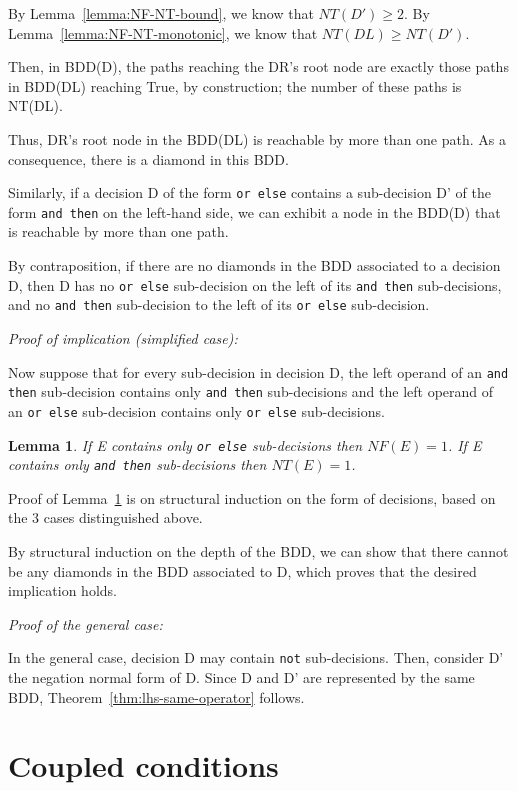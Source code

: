 \documentclass[a4paper,12pt,twoside]{article}
\renewcommand{\ge}{\geqslant}
\newcommand{\andthen}{\texttt{and then}}
\newcommand{\orelse}{\texttt{or else}}
\newcommand{\adanot}{\texttt{not}}
\newtheorem{lemma}{Lemma}[subsection]
\begin{document}
By Lemma~\ref{lemma:NF-NT-bound}, we know that $NT(D') \ge 2$. By
Lemma~\ref{lemma:NF-NT-monotonic}, we know that $NT(DL) \ge NT(D')$.

Then, in BDD(D), the paths reaching the DR's root node are exactly
those paths in BDD(DL) reaching True, by construction; the number of
these paths is NT(DL).

Thus, DR's root node in the BDD(DL) is reachable by more than one
path. As a consequence, there is a diamond in this BDD.

Similarly, if a decision D of the form \orelse{} contains a
sub-decision D' of the form \andthen{} on the left-hand side, we can
exhibit a node in the BDD(D) that is reachable by more
than one path.

By contraposition, if there are no diamonds in the BDD associated to a
decision D, then D has no \orelse{} sub-decision on the left of its
\andthen{} sub-decisions, and no \andthen{} sub-decision to the left of
its \orelse{} sub-decision.

\emph{Proof of implication (simplified case):}

Now suppose that for every sub-decision in decision D, the left
operand of an \andthen{} sub-decision contains only \andthen{}
sub-decisions and the left operand of an \orelse{} sub-decision
contains only \orelse{} sub-decisions.

\begin{lemma}
\label{lemma:NF-NT-only-one-oper}
If E contains only \orelse{} sub-decisions then $NF(E) = 1$.
If E contains only \andthen{} sub-decisions then $NT(E) = 1$.
\end{lemma}

Proof of Lemma~\ref{lemma:NF-NT-only-one-oper} is on structural induction on
the form of decisions, based on the 3 cases distinguished above.

By structural induction on the depth of the BDD, we can show that there cannot
be any diamonds in the BDD associated to D, which proves that the desired
implication holds.

\emph{Proof of the general case:}

In the general case, decision D may contain \adanot{} sub-decisions. Then,
consider D' the negation normal form of D. Since D and D' are represented
by the same BDD, Theorem~\ref{thm:lhs-same-operator} follows.


\section{Coupled conditions}
\end{document}
